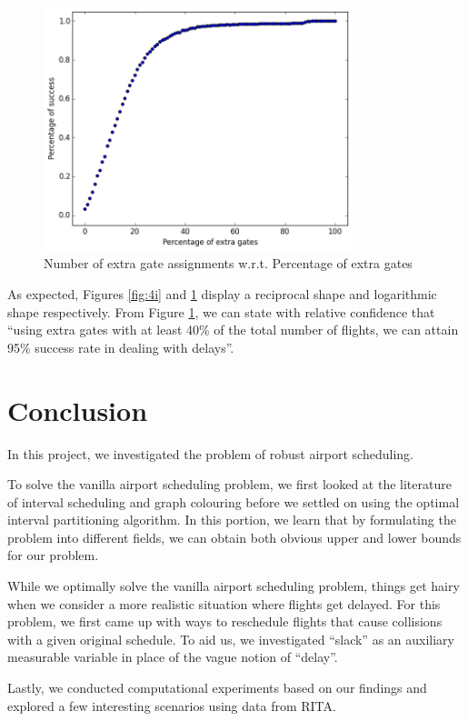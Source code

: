\documentclass[12pt, a4paper]{report}
\begin{document}
\begin{figure}[h!]
\centering
\includegraphics[width=0.8\textwidth]{../graph/4ii.png}
\caption{Number of extra gate assignments w.r.t. Percentage of extra gates}
\label{fig:4ii}
\end{figure}

\newpage
As expected, Figures \ref{fig:4i} and \ref{fig:4ii} display a reciprocal shape and logarithmic shape respectively. From Figure \ref{fig:4ii}, we can state with relative confidence that ``using extra gates with at least 40\% of the total number of flights, we can attain 95\% success rate in dealing with delays''.



\chapter{Conclusion}
In this project, we investigated the problem of robust airport scheduling.

To solve the vanilla airport scheduling problem, we first looked at the literature of interval scheduling and graph colouring before we settled on using the optimal interval partitioning algorithm. In this portion, we learn that by formulating the problem into different fields, we can obtain both obvious upper and lower bounds for our problem.

While we optimally solve the vanilla airport scheduling problem, things get hairy when we consider a more realistic situation where flights get delayed. For this problem, we first came up with ways to reschedule flights that cause collisions with a given original schedule. To aid us, we investigated ``slack'' as an auxiliary measurable variable in place of the vague notion of ``delay''.

Lastly, we conducted computational experiments based on our findings and explored a few interesting scenarios using data from RITA.
\end{document}
